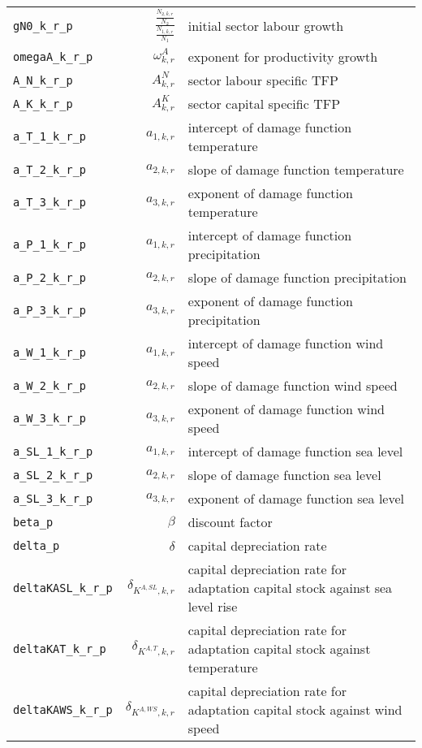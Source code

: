 \begin{center}
\begin{longtable}{lrl}
\texttt{gN0\_k\_r\_p} & $\frac{\frac{N_{2,k,r}}{N_{2}}}{\frac{N_{1,k,r}}{N_{1}}}$ & initial sector labour growth\\
\texttt{omegaA\_k\_r\_p} & ${\omega^{A}_{k,r}}$ & exponent for productivity growth\\
\texttt{A\_N\_k\_r\_p} & ${A^{N}_{k,r}}$ & sector labour specific TFP\\
\texttt{A\_K\_k\_r\_p} & ${A^{K}_{k,r}}$ & sector capital specific TFP\\
\texttt{a\_T\_1\_k\_r\_p} & ${a_{1,k,r}}$ & intercept of damage function temperature\\
\texttt{a\_T\_2\_k\_r\_p} & ${a_{2,k,r}}$ & slope of damage function temperature\\
\texttt{a\_T\_3\_k\_r\_p} & ${a_{3,k,r}}$ & exponent of damage function temperature\\
\texttt{a\_P\_1\_k\_r\_p} & ${a_{1,k,r}}$ & intercept of damage function precipitation\\
\texttt{a\_P\_2\_k\_r\_p} & ${a_{2,k,r}}$ & slope of damage function precipitation\\
\texttt{a\_P\_3\_k\_r\_p} & ${a_{3,k,r}}$ & exponent of damage function precipitation\\
\texttt{a\_W\_1\_k\_r\_p} & ${a_{1,k,r}}$ & intercept of damage function wind speed\\
\texttt{a\_W\_2\_k\_r\_p} & ${a_{2,k,r}}$ & slope of damage function wind speed\\
\texttt{a\_W\_3\_k\_r\_p} & ${a_{3,k,r}}$ & exponent of damage function wind speed\\
\texttt{a\_SL\_1\_k\_r\_p} & ${a_{1,k,r}}$ & intercept of damage function sea level\\
\texttt{a\_SL\_2\_k\_r\_p} & ${a_{2,k,r}}$ & slope of damage function sea level\\
\texttt{a\_SL\_3\_k\_r\_p} & ${a_{3,k,r}}$ & exponent of damage function sea level\\
\texttt{beta\_p} & ${\beta}$ & discount factor\\
\texttt{delta\_p} & ${\delta}$ & capital depreciation rate\\
\texttt{deltaKASL\_k\_r\_p} & ${\delta_{K^{A,SL},k,r}}$ & capital depreciation rate for adaptation capital stock against sea level rise\\
\texttt{deltaKAT\_k\_r\_p} & ${\delta_{K^{A,T},k,r}}$ & capital depreciation rate for adaptation capital stock against temperature\\
\texttt{deltaKAWS\_k\_r\_p} & ${\delta_{K^{A,WS},k,r}}$ & capital depreciation rate for adaptation capital stock against wind speed\\

\end{longtable}
\end{center}
